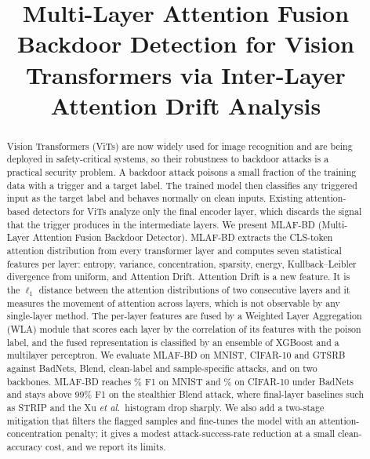 \documentclass[journal]{IEEEtran}
\begin{document}
\title{Multi-Layer Attention Fusion Backdoor Detection for Vision Transformers
via Inter-Layer Attention Drift Analysis}

\author{

}
\maketitle

\begin{abstract}
Vision Transformers (ViTs) are now widely used for image recognition and are
being deployed in safety-critical systems, so their robustness to backdoor
attacks is a practical security problem. A backdoor attack poisons a small
fraction of the training data with a trigger and a target label. The trained
model then classifies any triggered input as the target label and behaves
normally on clean inputs. Existing attention-based detectors for ViTs analyze
only the final encoder layer, which discards the signal that the trigger
produces in the intermediate layers. We present MLAF-BD (Multi-Layer Attention
Fusion Backdoor Detector). MLAF-BD extracts the CLS-token attention
distribution from every transformer layer and computes seven statistical
features per layer: entropy, variance, concentration, sparsity, energy,
Kullback--Leibler divergence from uniform, and Attention Drift. Attention Drift
is a new feature. It is the $\ell_1$ distance between the attention
distributions of two consecutive layers and it measures the movement of
attention across layers, which is not observable by any single-layer method.
The per-layer features are fused by a Weighted Layer Aggregation (WLA) module
that scores each layer by the correlation of its features with the poison
label, and the fused representation is classified by an ensemble of XGBoost and
a multilayer perceptron. We evaluate MLAF-BD on MNIST, CIFAR-10 and GTSRB
against BadNets, Blend, clean-label and sample-specific attacks, and on two
backbones. MLAF-BD reaches \MLAFMnistBadF\% F1 on MNIST and \MLAFCifarBadF\% on
CIFAR-10 under BadNets and stays above 99\% F1 on the stealthier Blend attack,
where final-layer baselines such as STRIP and the Xu \emph{et al.}\ histogram
drop sharply. We also add a two-stage mitigation that filters the flagged
samples and fine-tunes the model with an attention-concentration penalty; it
gives a modest attack-success-rate reduction at a small clean-accuracy cost, and
we report its limits.
\end{abstract}
\end{document}
